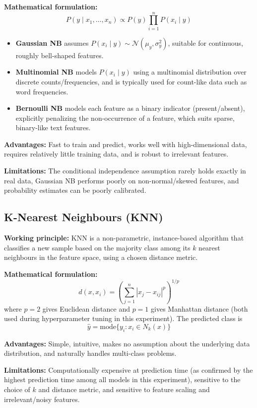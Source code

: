 \documentclass[12pt,a4paper]{article}
\begin{document}
\textbf{Mathematical formulation:}
\[
P(y \mid x_1, \dots, x_n) \propto P(y) \prod_{i=1}^{n} P(x_i \mid y)
\]
\begin{itemize}
\item \textbf{Gaussian NB} assumes $P(x_i \mid y) \sim \mathcal{N}(\mu_y, \sigma_y^2)$, suitable for continuous, roughly bell-shaped features.
\item \textbf{Multinomial NB} models $P(x_i \mid y)$ using a multinomial distribution over discrete counts/frequencies, and is typically used for count-like data such as word frequencies.
\item \textbf{Bernoulli NB} models each feature as a binary indicator (present/absent), explicitly penalizing the non-occurrence of a feature, which suits sparse, binary-like text features.
\end{itemize}

\textbf{Advantages:} Fast to train and predict, works well with high-dimensional data, requires relatively little training data, and is robust to irrelevant features.

\textbf{Limitations:} The conditional independence assumption rarely holds exactly in real data, Gaussian NB performs poorly on non-normal/skewed features, and probability estimates can be poorly calibrated.

\subsection*{K-Nearest Neighbours (KNN)}
\textbf{Working principle:} KNN is a non-parametric, instance-based algorithm that classifies a new sample based on the majority class among its $k$ nearest neighbours in the feature space, using a chosen distance metric.

\textbf{Mathematical formulation:}
\[
d(x, x_i) = \left(\sum_{j=1}^{n} |x_j - x_{ij}|^p\right)^{1/p}
\]
where $p=2$ gives Euclidean distance and $p=1$ gives Manhattan distance (both used during hyperparameter tuning in this experiment). The predicted class is
\[
\hat{y} = \text{mode}\{y_i : x_i \in N_k(x)\}
\]

\textbf{Advantages:} Simple, intuitive, makes no assumption about the underlying data distribution, and naturally handles multi-class problems.

\textbf{Limitations:} Computationally expensive at prediction time (as confirmed by the highest prediction time among all models in this experiment), sensitive to the choice of $k$ and distance metric, and sensitive to feature scaling and irrelevant/noisy features.
\end{document}
